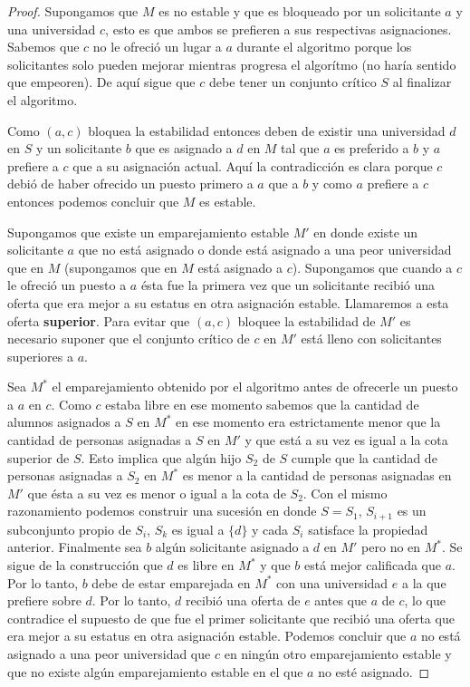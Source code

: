 \begin{proof}
Supongamos que $M$ es no estable y que es bloqueado por un solicitante $a$ y una universidad $c$, esto es que ambos se prefieren a sus respectivas asignaciones. Sabemos que $c$ no le ofreció un lugar a $a$ durante el algoritmo porque los solicitantes solo pueden mejorar mientras progresa el algorítmo (no haría sentido que empeoren). De aquí sigue que $c$ debe tener un conjunto crítico $S$ al finalizar el algoritmo.

Como $(a,c)$ bloquea la estabilidad entonces deben de existir una universidad $d$ en $S$ y un solicitante $b$ que es asignado a $d$ en $M$ tal que $a$ es preferido a $b$ y $a$ prefiere a $c$ que a su asignación actual. Aquí la contradicción es clara porque $c$ debió de haber ofrecido un puesto primero a $a$ que a $b$ y como $a$ prefiere a $c$ entonces podemos concluir que $M$ es estable. 

Supongamos que existe un emparejamiento estable $M'$ en donde existe un solicitante $a$ que no está asignado o donde está asignado a una peor universidad que en $M$ (supongamos que en $M$ está asignado a $c$). Supongamos que cuando a $c$ le ofreció un puesto a $a$ ésta fue la primera vez que un solicitante recibió una oferta que era mejor a su estatus en otra asignación estable. Llamaremos a esta oferta \textbf{superior}. Para evitar que $(a,c)$ bloquee la estabilidad de $M'$ es necesario suponer que el conjunto crítico de $c$ en $M'$ está lleno con solicitantes superiores a $a$. 

Sea $M^*$ el emparejamiento obtenido por el algoritmo antes de ofrecerle un puesto a $a$ en $c$. Como $c$ estaba libre en ese momento sabemos que la cantidad de alumnos asignados a $S$ en $M^*$ en ese momento era estrictamente menor que la cantidad de personas asignadas a $S$ en $M'$ y que está a su vez es igual a la cota superior de $S$. Esto implica que algún hijo $S_2$ de $S$ cumple que la cantidad de personas asignadas a $S_2$ en $M^*$ es menor a la cantidad de personas asignadas en $M'$ que ésta a su vez es menor o igual a la cota de $S_2$. Con el mismo razonamiento podemos construir una sucesión en donde $S=S_1$, $S_{i+1}$ es un subconjunto propio de $S_i$, $S_{k}$ es igual a $\{d\}$ y cada $S_i$ satisface la propiedad anterior. Finalmente sea $b$ algún solicitante asignado a $d$ en $M'$ pero no en $M^*$. Se sigue de la construcción que $d$ es libre en $M^*$ y que $b$ está mejor calificada que $a$. Por lo tanto, $b$ debe de estar emparejada en $M^*$ con una universidad $e$ a la que prefiere sobre $d$. Por lo tanto, $d$ recibió una oferta de $e$ antes que $a$ de $c$, lo que contradice el supuesto de que fue el primer solicitante que recibió una oferta que era mejor a su estatus en otra asignación estable. Podemos concluir que $a$ no está asignado a una peor universidad que $c$ en ningún otro emparejamiento estable y que no existe algún emparejamiento estable en el que $a$ no esté asignado. 


\end{proof}
